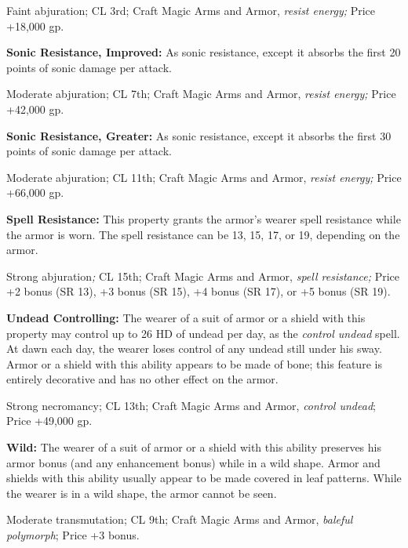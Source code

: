 Faint abjuration; CL 3rd; Craft Magic Arms and Armor, \textit{resist energy; }Price 
+18,000 gp.

\textbf{Sonic Resistance, Improved:} As sonic resistance, except it absorbs the 
first 20 points of sonic damage per attack.

Moderate abjuration; CL 7th; Craft Magic Arms and Armor, \textit{resist energy; 
}Price +42,000 gp.

\textbf{Sonic Resistance, Greater:} As sonic resistance, except it absorbs the 
first 30 points of sonic damage per attack.

Moderate abjuration; CL 11th; Craft Magic Arms and Armor, \textit{resist energy; 
}Price +66,000 gp.

\textbf{Spell Resistance: }This property grants the armor's wearer spell resistance 
while the armor is worn. The spell resistance can be 13, 15, 17, or 19, depending 
on the armor.

Strong abjuration\textit{; }CL 15th; Craft Magic Arms and Armor, \textit{spell 
resistance; }Price +2 bonus (SR 13), +3 bonus (SR 15), +4 bonus (SR 17), or +5 
bonus (SR 19).

\textbf{Undead Controlling:} The wearer of a suit of armor or a shield with this 
property may control up to 26 HD of undead per day, as the \textit{control undead 
}spell. At dawn each day, the wearer loses control of any undead still under his 
sway. Armor or a shield with this ability appears to be made of bone; this feature 
is entirely decorative and has no other effect on the armor.

Strong necromancy; CL 13th; Craft Magic Arms and Armor, \textit{control undead}; 
Price +49,000 gp.

\textbf{Wild:} The wearer of a suit of armor or a shield with this ability preserves 
his armor bonus (and any enhancement bonus) while in a wild shape. Armor and shields 
with this ability usually appear to be made covered in leaf patterns. While the 
wearer is in a wild shape, the armor cannot be seen.

Moderate transmutation; CL 9th; Craft Magic Arms and Armor, \textit{baleful polymorph}; 
Price +3 bonus.

